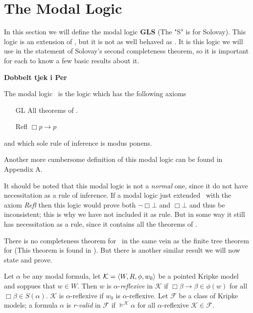 \documentclass[../main.tex]{subfiles}
\begin{document}
\section{The Modal Logic }

In this section we will define the modal logic \textbf{GLS} (The "S" is for
Solovay). This logic is an extension of \GL, but it is not as well behaved as
\GL. It is this logic we will use in the statement of Solovay's second
completeness theorem, so it is important for each to know a few basic results
about it.

\begin{defi}
	\textbf{Dobbelt tjek i Per}

	The modal logic \GLS\ is the logic which has the following axioms 
	\begin{enumerate}
		\item[GL] All theorems of \GL.
		\item[Refl] $\Box p\rightarrow p $
	\end{enumerate}
	and which sole rule of inference is modus ponens.
\end{defi}

Another more cumbersome definition of this modal logic can be found in
Appendix A.

It should be noted that this modal logic is not a \textit{normal} one, since it
do not have  necessitation as a rule of inference. If a modal logic just extended
\GL\ with the axiom \textit{Refl} then this logic would prove both
$\neg\Box\bot$ and $\Box\bot$ and thus be inconsistent; this is why we have not
included it as rule. But in some way it still has necessitation as a rule,
since it contains all the theorems of \GL.

There is no completeness theorem for \GLS\ in the same vein as the finite tree
theorem for \GL (This theorem is found in \parencite{Lind1997}). But there is another similar result we will now state and
prove.
\begin{defi}
	Let $\alpha$ be any modal formula, let $\mathcal{K}=\langle
W,R,\phi,w_0\rangle$ be a pointed Kripke model and soppues that $w\in W$.
Then $w$ is $\alpha$-\textit{reflexive} in $\mathcal{K}$ if
$\Box\beta\rightarrow\beta\in\phi(w)$ for all $\Box\beta\in S(\alpha)$.
$\mathcal{K}$ is $\alpha$-reflexive if $w_0$ is $\alpha$-reflexive. Let
$\mathcal{F}$ be a class of Kripke models; a formula $\alpha$ is
\textit{r-valid} in $\mathcal{F}$ if $\vDash^\mathcal{K}\alpha$ for all
$\alpha$-reflexive $\mathcal{K}\in\mathcal{F}$.
\end{defi}
\end{document}
